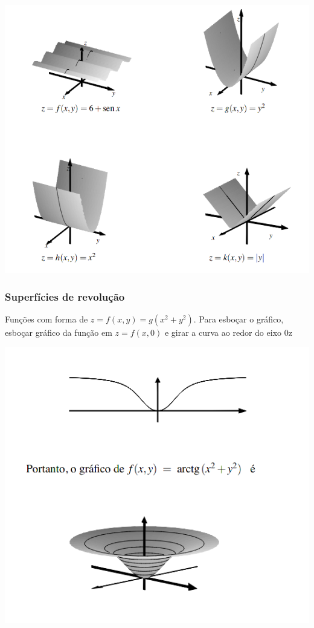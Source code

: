 \documentclass[letterpaper, 11pt]{article}
\begin{document}
\begin{center}
\includegraphics[width=.9\linewidth]{./img/cilindricas.png}
\end{center}

\subsubsection{Superfícies de revolução}
\label{sec:orgeaeca34}
Funções com forma de \(z= f(x,y) = g(x^2+y^2)\). Para esboçar o gráfico, esboçar gráfico da função em \(z=f(x,0)\) e girar a curva ao redor do eixo 0z

\begin{center}
\includegraphics[width=.9\linewidth]{./img/revolucao.png}
\end{center}
\end{document}
